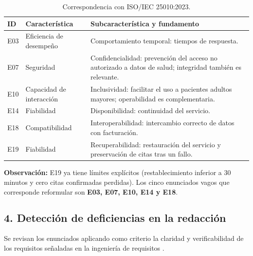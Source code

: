 \documentclass[12pt,a4paper]{article}
\begin{document}
\begin{table}[H]
\centering
\small
\begin{tabularx}{\textwidth}{|l|X|X|}
\hline
\textbf{ID} & \textbf{Característica} & \textbf{Subcaracterística y fundamento} \\ \hline

E03 & Eficiencia de desempeño &
Comportamiento temporal: tiempos de respuesta. \\ \hline

E07 & Seguridad &
Confidencialidad: prevención del acceso no autorizado a datos de salud; integridad también es relevante. \\ \hline

E10 & Capacidad de interacción &
Inclusividad: facilitar el uso a pacientes adultos mayores; operabilidad es complementaria. \\ \hline

E14 & Fiabilidad &
Disponibilidad: continuidad del servicio. \\ \hline

E18 & Compatibilidad &
Interoperabilidad: intercambio correcto de datos con facturación. \\ \hline

E19 & Fiabilidad &
Recuperabilidad: restauración del servicio y preservación de citas tras un fallo. \\ \hline

\end{tabularx}
\caption{Correspondencia con ISO/IEC 25010:2023.}
\end{table}

\textbf{Observación:} E19 ya tiene límites explícitos (restablecimiento inferior a 30 minutos y cero citas confirmadas perdidas). Los cinco enunciados vagos que corresponde reformular son \textbf{E03, E07, E10, E14 y E18}.


\subsection*{4. Detección de deficiencias en la redacción}

Se revisan los enunciados aplicando como criterio la claridad y verificabilidad de los requisitos señaladas en la ingeniería de requisitos \cite{iso29148}.
\end{document}
